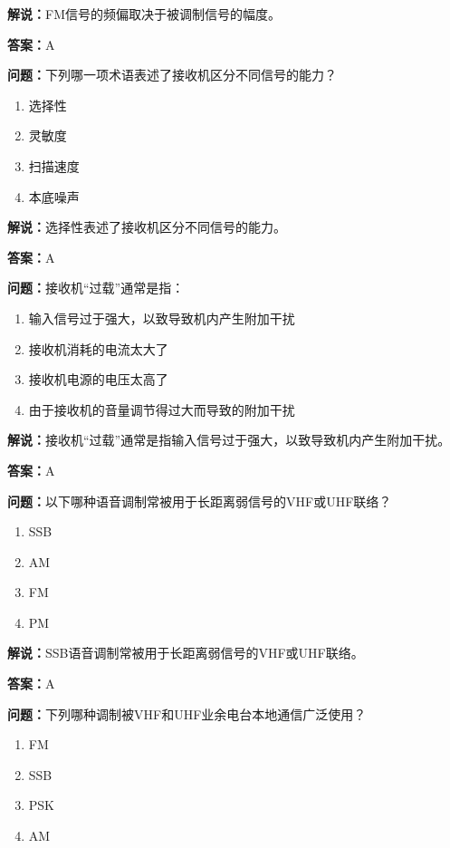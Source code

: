 \textbf{解说：}FM信号的频偏取决于被调制信号的幅度。%

\textbf{答案：}A

\textbf{问题：}下列哪一项术语表述了接收机区分不同信号的能力？

\begin{enumerate}[label=\Alph*), leftmargin=1cm]
	\item 选择性
	\item 灵敏度
	\item 扫描速度
	\item 本底噪声
\end{enumerate}

\textbf{解说：}选择性表述了接收机区分不同信号的能力。%

\textbf{答案：}A

\textbf{问题：}接收机“过载”通常是指：

\begin{enumerate}[label=\Alph*), leftmargin=1cm]
	\item 输入信号过于强大，以致导致机内产生附加干扰
	\item 接收机消耗的电流太大了
	\item 接收机电源的电压太高了
	\item 由于接收机的音量调节得过大而导致的附加干扰
\end{enumerate}

\textbf{解说：}接收机“过载”通常是指输入信号过于强大，以致导致机内产生附加干扰。%

\textbf{答案：}A

\textbf{问题：}以下哪种语音调制常被用于长距离弱信号的VHF或UHF联络？

\begin{enumerate}[label=\Alph*), leftmargin=1cm]
	\item SSB
	\item AM
	\item FM
	\item PM
\end{enumerate}

\textbf{解说：}SSB语音调制常被用于长距离弱信号的VHF或UHF联络。%

\textbf{答案：}A

\textbf{问题：}下列哪种调制被VHF和UHF业余电台本地通信广泛使用？

\begin{enumerate}[label=\Alph*), leftmargin=1cm]
	\item FM
	\item SSB
	\item PSK
	\item AM
\end{enumerate}

